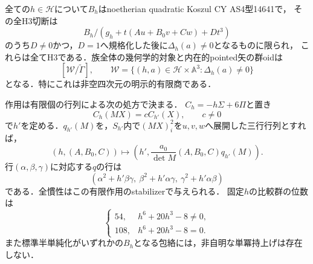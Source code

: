 \begin{theorem}
\label{thm:clifford-hesse-all-cuts}
全ての$h\in\mathcal H$について$B_h$はnoetherian quadratic Koszul CY AS4型14641で，
その全H3切断は
\[
 B_h/(g_h+t(Au+B_0v+Cw)+Dt^3)
\]
のうち$D\ne0$かつ，$D=1$へ規格化した後に$\Delta_h(a)\ne0$となるものに限られ，
これらは全てH3である．族全体の幾何学的対象と内在的pointed矢の群oidは
\[
 [\mathcal W/\widetilde\Gamma],\qquad
 \mathcal W=\{(h,a)\in\mathcal H\times\mathbb A^3:\Delta_h(a)\ne0\}
\]
となる．特にこれは非空四次元の明示的有限商である．

作用は有限個の行列による次の処方で決まる．
$C_h=-h\Sigma+6\Pi$と置き
\[
 C_h(MX)=c C_{h'}(X),\qquad c\ne0
\]
で$h'$を定める．$q_{h'}(M)$を，$S_{h'}$内で$(MX)_i^2$を$u,v,w$へ展開した三行行列とすれば，
\[
 (h,(A,B_0,C))\longmapsto
 \left(h',\frac{a_0}{\det M}(A,B_0,C)q_{h'}(M)\right).
\]
行$(\alpha,\beta,\gamma)$に対応する$q$の行は
\[
 (\alpha^2+h'\beta\gamma,\ \beta^2+h'\alpha\gamma,\ \gamma^2+h'\alpha\beta)
\]
である．全慣性はこの有限作用のstabilizerで与えられる．
固定$h$の比較群の位数は
\[
 \begin{cases}54,&h^6+20h^3-8\ne0,\\108,&h^6+20h^3-8=0.\end{cases}
\]
また標準半単純化がいずれかの$B_h$となる包絡には，非自明な単冪持上げは存在しない．
\end{theorem}
